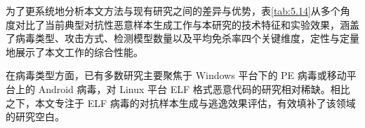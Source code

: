 \begin{conclusion}




为了更系统地分析本文方法与现有研究之间的差异与优势，表\ref{tab:5.14}从多个角度对比了当前典型对抗性恶意样本生成工作与本研究的技术特征和实验效果，涵盖了病毒类型、攻击方式、检测模型数量以及平均免杀率四个关键维度，定性与定量地展示了本文工作的综合性能。


在病毒类型方面，已有多数研究主要聚焦于 Windows 平台下的 PE 病毒或移动平台上的 Android 病毒，对 Linux 平台 ELF 格式恶意代码的研究相对稀缺。相比之下，本文专注于 ELF 病毒的对抗样本生成与逃逸效果评估，有效填补了该领域的研究空白。



\end{conclusion}
